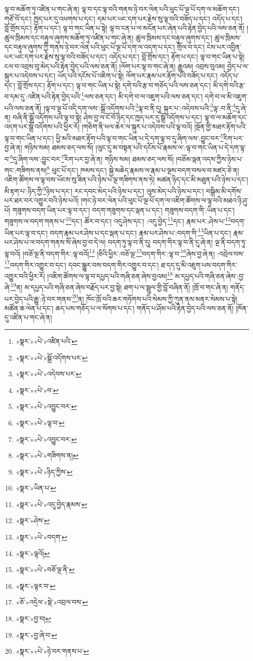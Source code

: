 ལྟ་བ་མཆོག་ཏུ་འཛིན་པ་གང་ཞེ་ན། ལྟ་བ་དང་ལྟ་བའི་གནས་ཉེ་བར་ལེན་པའི་ཕུང་པོ་ལྔ་པོ་དག་ལ་མཆོག་དང་། གཙོ་བོ་དང་། ཁྱད་པར་དུ་འཕགས་པ་དང་། དམ་པར་ཡང་དག་པར་རྗེས་སུ་ལྟ་བའི་བཟོད་པ་དང་། འདོད་པ་དང་། བློ་གྲོས་དང་། རྟོག་པ་དང་། ལྟ་བ་གང་ཡིན་པ་སྟེ། ལྟ་བ་ངན་པ་ལ་མངོན་པར་ཞེན་པའི་རྟེན་བྱེད་པའི་ལས་ཅན་ནོ། །ཚུལ་ཁྲིམས་དང་བརྟུལ་ཞུགས་མཆོག་ཏུ་འཛིན་པ་གང་ཞེ་ན། ཚུལ་ཁྲིམས་དང་བརྟུལ་ཞུགས་དང་། ཚུལ་ཁྲིམས་དང་བརྟུལ་ཞུགས་ཀྱི་གནས་ཉེ་བར་ལེན་པའི་ཕུང་པོ་ལྔ་པོ་དག་ལ་འདག་པ་དང་། གྲོལ་བ་དང་། ངེས་པར་འབྱིན་པར་ཡང་དག་པར་རྗེས་སུ་ལྟ་བའི་བཟོད་པ་དང་། འདོད་པ་དང་། བློ་གྲོས་དང་། རྟོག་པ་དང་། ལྟ་བ་གང་ཡིན་པ་སྟེ། ངལ་བ་འབྲས་བུ་མེད་པའི་རྟེན་བྱེད་པའི་ལས་ཅན་ནོ། །ལོག་པར་ལྟ་བ་གང་ཞེ་ན། རྒྱུའམ། འབྲས་བུའམ། བྱེད་པ་ལ་སྐུར་པ་འདེབས་པ་དང་། ཡོད་པའི་དངོས་པོ་འཇིག་པ་སྟེ། ལོག་པར་རྣམ་པར་རྟོག་པའི་བཟོད་པ་དང་། འདོད་པ་དང་། བློ་གྲོས་དང་། རྟོག་པ་དང་། ལྟ་བ་གང་ཡིན་པ་སྟེ། དགེ་བའི་རྩ་བ་གཅོད་པའི་ལས་ཅན་དང་། མི་དགེ་བའི་རྩ་བ་དམ་དུ་:འཛིན་པའི་རྟེན་བྱེད་པའི་\footnote{«སྣར་»«པེ་»འཛིན་པའི་}ལས་ཅན་དང་། མི་དགེ་བ་ལ་འཇུག་པའི་ལས་ཅན་དང་། དགེ་བ་ལ་མི་འཇུག་པའི་ལས་ཅན་ནོ། །ལྟ་བ་ལྔ་པོ་འདི་དག་ལས་:སྒྲོ་འདོགས་པའི་\footnote{«སྣར་»«པེ་»སྒྲོ་འདོགས་པར་}ལྟ་བ་ནི་དུ། སྐུར་པ་:འདེབས་པའི་\footnote{«སྣར་»«པེ་»འདེབས་པར་}ལྟ་:བ་ནི་\footnote{«སྣར་»«པེ་»བ་}དུ་ཞེ་ན། བཞི་ནི་སྒྲོ་འདོགས་པའི་ལྟ་བ་སྟེ། ཤེས་བྱ་ལ་ངོ་བོ་ཉིད་དང་ཁྱད་པར་དུ་སྒྲོ་འདོགས་པ་དང་། ལྟ་བ་ལ་མཆོག་དང་འདག་པར་སྒྲོ་འདོགས་པའི་ཕྱིར་རོ། །གཅིག་ནི་ཕལ་ཆེར་ལ་སྐུར་པ་འདེབས་པའི་ལྟ་བའོ། །སྔོན་གྱི་མཐར་རྟོག་པའི་ལྟ་བ་གང་ཡིན་པ་དང་། ཕྱི་མའི་མཐར་རྟོག་པའི་ལྟ་བ་གང་ཡིན་པ་དེ་དག་ལྟ་བ་དུ་ཞིག་ལས་:བྱུང་བར་\footnote{«སྣར་»«པེ་»འབྱུང་བར་}རིག་པར་བྱ་ཞེ་ན། གཉིས་སམ། ཐམས་ཅད་ལས་སོ། །ལུང་དུ་མ་བསྟན་པའི་དངོས་པོ་རྣམས་ལ་:ལྟ་བ་གང་ཡིན་པ་དེ་དག་ལྟ་བ་\footnote{«སྣར་»«པེ་»ལྟ་བ་}དུ་ཞིག་ལས་:བྱུང་བར་\footnote{«སྣར་»«པེ་»འབྱུང་བར་}རིག་པར་བྱ་ཞེ་ན། གཉིས་སམ། ཐམས་ཅད་ལས་སོ། །བཅོམ་ལྡན་འདས་ཀྱིས་ཉེས་པ་གང་:གཟིགས་ནས།\footnote{«སྣར་»«པེ་»གཟིགས་ན།} ཕུང་པོ་དང་། ཁམས་དང་། སྐྱེ་མཆེད་རྣམས་ལ་རྣམ་པ་ལྔས་བདག་བསལ་བ་མཛད་ཅེ་ན། འཇིག་ཚོགས་ལ་ལྟ་བས་ཡོངས་སུ་ཟིན་པའི་ཉེས་པ་ལྔ་གཟིགས་ནས་ཏེ། མཚན་ཉིད་དང་མི་མཐུན་པའི་ཉེས་པ་དང་། མི་རྟག་པ་:ཉིད་ཀྱི་\footnote{«སྣར་»«པེ་»ཉིད་ཀྱིས་}ཉེས་པ་དང་། རང་དབང་མེད་པའི་ཉེས་པ་དང་། ལུས་མེད་པའི་ཉེས་པ་དང་། བསྒྲིམ་མི་དགོས་པར་ཐར་བར་འགྱུར་བའི་ཉེས་པའོ། །གང་ཉེ་བར་ལེན་པའི་ཕུང་པོ་ལྔ་པོ་དག་ལ་འཇིག་ཚོགས་ལ་ལྟ་བའི་མཐའ་ཉི་ཤུ་པོ། གཟུགས་བདག་ཡིན་པར་ལྟ་བ་དང་། བདག་གཟུགས་དང་ལྡན་པ་དང་། གཟུགས་བདག་གི་:ཡིན་པ་དང་།གཟུགས་ལ་བདག་གནས་པ་\footnote{«སྣར་»ཡིན་པ་}དང་། ཚོར་བ་དང་། འདུ་ཤེས་དང་། :འདུ་བྱེད་\footnote{«སྣར་»«པེ་»འདུ་བྱེད་རྣམས་}དང་། རྣམ་པར་:ཤེས་པ་\footnote{«སྣར་»ཤེས་}བདག་ཡིན་པར་ལྟ་བ་དང་། བདག་རྣམ་པར་ཤེས་པ་དང་ལྡན་པ་དང་། རྣམ་པར་ཤེས་པ་:བདག་གི་\footnote{«སྣར་»«པེ་»བདག་}ཡིན་པ་དང་། རྣམ་པར་ཤེས་པ་ལ་བདག་གནས་སོ་ཞེས་བྱ་བ་དེ་ལ། བདག་ཏུ་ལྟ་བ་ནི་དུ། བདག་གིར་ལྟ་བ་ནི་དུ་ཞེ་ན། ལྔ་ནི་བདག་ཏུ་ལྟ་བའོ། །བཅོ་ལྔ་ནི་བདག་གིར་:ལྟ་བའོ།\footnote{«སྣར་»ལྟའོ།} །ཅིའི་ཕྱིར་:བཅོ་ལྔ་\footnote{«སྣར་»«པེ་»བཅོ་ལྔ་ནི་}བདག་གིར་:ལྟ་བ་\footnote{«སྣར་»ལྟར་བ་}ཞེས་བྱ་ཞེ་ན། :འབྲེལ་བས་\footnote{«ཅོ་»འདྲེལ་«སྡེ་»འབྲལ་བས་}བདག་གིར་འགྱུར་བ་དང་། དབང་སྒྱུར་བས་བདག་གིར་འགྱུར་བ་དང་། ཐ་དད་དུ་མི་འཇུག་པས་བདག་གིར་འགྱུར་བའི་ཕྱིར་རོ། །འཇིག་ཚོགས་ལ་ལྟ་བ་དཔྱད་པའི་གཞི་ཅན་ཞེས་བྱའམ།\footnote{«སྣར་»བྱ་བ།} མ་དཔྱད་པའི་གཞི་ཅན་ཞེས་:བྱ་ཞེ་\footnote{«སྣར་»བྱ་ཞེ་བ་}ན། མ་དཔྱད་པའི་གཞི་ཅན་ཞེས་བརྗོད་པར་བྱ་སྟེ། ཐག་པ་ལ་སྦྲུལ་གྱི་བློ་བཞིན་ནོ། །ཁྲོ་བ་གང་ཞེ་ན། གནོད་པར་བྱེད་པའི་རྒྱུ་:ཉེ་བར་གནས་\footnote{«སྣར་»«པེ་»ཉེ་བར་གནས་པ་}ན། ཁོང་ཁྲོ་བའི་ཆར་གཏོགས་པའི་སེམས་ཀྱི་ཀུན་ནས་མནར་སེམས་པ་སྟེ། མཚོན་ཆ་ལེན་པ་དང་། ཆད་པས་གཅོད་པ་ལ་སོགས་པ་དང་། གནོད་པ་ཤོམ་པའི་རྟེན་བྱེད་པའི་ལས་ཅན་ནོ། །ཁོན་དུ་འཛིན་པ་གང་ཞེ་ན། 